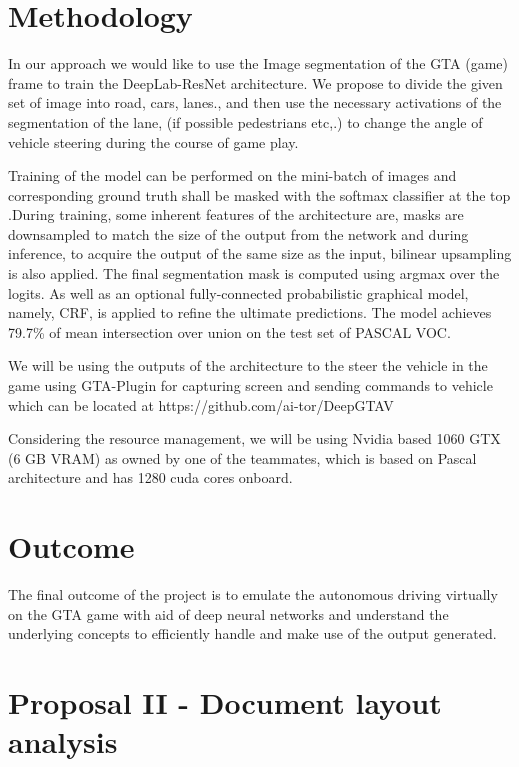 \documentclass[10pt,twocolumn,letterpaper]{article}
\begin{document}
	\section{Methodology}
	In our approach we would like to use the Image segmentation of the GTA (game) frame to train the DeepLab-ResNet architecture. We propose to divide the given set of image into road, cars, lanes., and then use the 
	necessary activations of the segmentation of the lane, (if possible pedestrians etc,.) to change the angle of vehicle steering during the course of game play.
	
	Training of the model can be performed on the mini-batch of images and corresponding ground truth shall be masked with the softmax classifier at the top .During training, some inherent features of the architecture are, masks are downsampled to match the size of the output from the network and during inference, to acquire the output of the same size as the input, bilinear upsampling is also applied. The final segmentation mask is computed using argmax over the logits. As well as an optional fully-connected probabilistic graphical model, namely, CRF, is applied to refine the ultimate predictions. The model achieves 79.7\% of mean intersection over union on the test set of PASCAL VOC. 
	
	We will be using the outputs of the architecture to the steer the vehicle in the game using GTA-Plugin for capturing screen and sending commands to vehicle which can be located at https://github.com/ai-tor/DeepGTAV
	
	Considering the resource management, we will be using Nvidia based 1060 GTX (6 GB VRAM) as owned by one of the teammates, which is based on Pascal architecture and has 1280 cuda cores onboard.
	
	\section{Outcome}
	The final outcome of the project is to emulate the autonomous driving virtually on the GTA game with aid of deep neural networks and understand the underlying concepts to efficiently handle and make use of the output generated.  
	
	
	\section*{Proposal II - Document layout analysis}
	\setcounter{section}{0}
	
\end{document}
